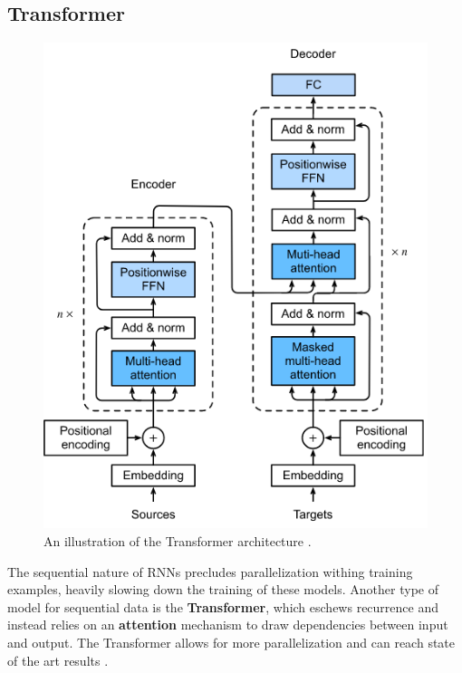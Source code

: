 \documentclass[./main.tex]{subfiles}
\begin{document}
\subsection{Transformer}
\begin{figure}[htbp]
    \centering
    \includegraphics[width = 0.5 \textwidth]{./entities/transformer.PNG}
    \caption{An illustration of the Transformer architecture \cite{d2l}.}
    \label{fig:transformer_illustration}
\end{figure}
The sequential nature of RNNs precludes parallelization withing training examples, heavily slowing down the training of these models. Another type of model for sequential data is the \textbf{Transformer}, which eschews recurrence and instead relies on an \textbf{attention} mechanism to draw dependencies between input and output. The Transformer allows for more parallelization and can reach state of the art results \cite{https://doi.org/10.48550/arxiv.1706.03762}.
\end{document}
